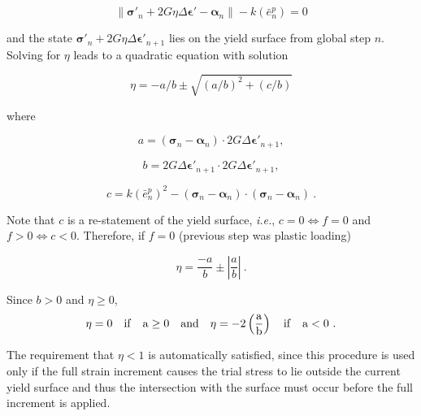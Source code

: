 \documentclass[11pt]{report}
\numberwithin{equation}{section}
\newcommand{\bmf } {\boldsymbol }
\begin{document}
\begin{equation}\label{E:ys_eta}
\left\| {{\bmf{\sigma }}{'_n} + 
2G\eta \Delta {\bmf{\epsilon}'} - {{\bmf{\alpha }}_n}} 
\right\| - k\left( {\bar e_n^p} \right) = 0
\end{equation}

\noindent and the state $\bmf \sigma'_n + 2 G \eta \Delta \bmf \epsilon'_{n+1}$ lies on the
yield surface from global step $n$. Solving for $\eta$ leads to
a quadratic equation with solution

\begin{equation}\label{E:eta_define}
\eta  =  - a/b \pm \sqrt {{{\left( {a/b} \right)}^2} + \left( {c/b} \right)} 
\end{equation}

\noindent where

\begin{equation}
a = \left( {{{\bmf{\sigma }}_n} - {{\bmf{\alpha }}_n}} \right) \cdot 2G\Delta {{\bmf{\epsilon}'}_{n + 1}},
\end{equation}

\begin{equation}
b = 2G\Delta {{\bmf{\epsilon}'}_{n + 1}} \cdot 2G\Delta \bmf \epsilon'_{n+1},
\end{equation}

\begin{equation}
c = k{\left( {\bar e_n^p} \right)^2} - \left( {{{\bmf{\sigma }}_n} - {{\bmf{\alpha }}_n}} \right) \cdot \left( {{{\bmf{\sigma }}_n} - {{\bmf{\alpha }}_n}} \right)~.
\end{equation}

\noindent Note that $c$ is a re-statement of the yield surface, \textit{i.e.}, $c = 0  
\Leftrightarrow f= 0$
and $f > 0 \Leftrightarrow c < 0$. Therefore, if $f=0$ (previous step was plastic loading)

\begin{equation}
\eta  = \frac{{ - a}}{b} \pm \left| {\frac{a}{b}} \right|~.
\end{equation}

\noindent Since $b>0$ and $\eta \ge 0$,
\begin{equation}
\eta=0 \quad \rm{if} \quad a\geq 0 \quad \rm{and} \quad \eta=\displaystyle -
2\left(\frac{a}{b}\right) \quad \rm{if} \quad a<0~.
\end{equation}

The requirement that $\eta < 1$ is automatically satisfied, since this 
procedure is used only if the full strain increment causes the trial stress 
to lie outside the current yield surface and thus the intersection 
with the surface must occur before the full increment is applied.
\end{document}
